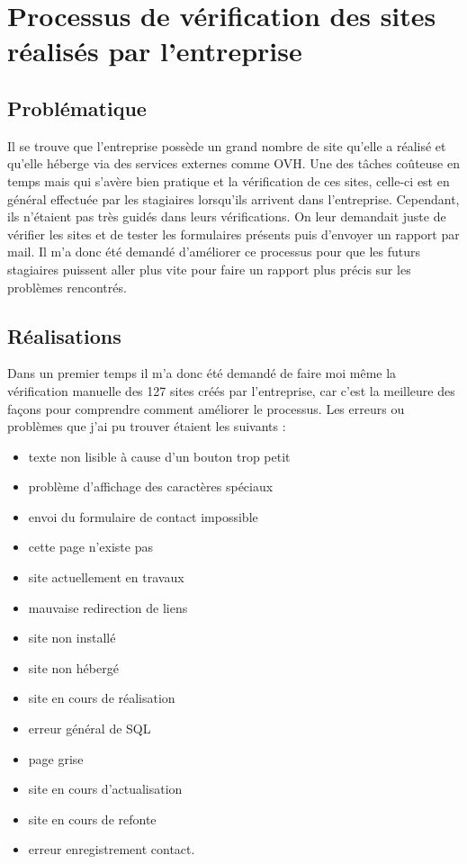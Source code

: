 \documentclass[report]{tnreport}
\begin{document}
\chapter{Processus de vérification des sites réalisés par l’entreprise}

\section{Problématique}

Il se trouve que l’entreprise possède un grand nombre de site qu’elle a réalisé et qu’elle héberge via des services externes comme OVH. Une des tâches coûteuse en temps mais qui s’avère bien pratique et la vérification de ces sites, celle-ci est en général effectuée par les stagiaires lorsqu’ils arrivent dans l’entreprise. Cependant, ils n’étaient pas très guidés dans leurs vérifications. On leur demandait juste de vérifier les sites et de tester les formulaires présents puis d’envoyer un rapport par mail. Il m’a donc été demandé d’améliorer ce processus pour que les futurs stagiaires puissent aller plus vite pour faire un rapport plus précis sur les problèmes rencontrés.


\section{Réalisations}

Dans un premier temps il m’a donc été demandé de faire moi même la vérification manuelle des 127 sites créés par l’entreprise, car c’est la meilleure des façons pour comprendre comment améliorer le processus.
Les erreurs ou problèmes que j’ai pu trouver étaient les suivants : 

\begin{itemize}
\item texte non lisible à cause d’un bouton trop petit
\item problème d’affichage des caractères spéciaux
\item envoi du formulaire de contact impossible
\item cette page n’existe pas
\item site actuellement en travaux
\item mauvaise redirection de liens
\item site non installé
\item site non hébergé
\item site en cours de réalisation
\item erreur général de SQL
\item page grise
\item site en cours d’actualisation
\item site en cours de refonte
\item erreur enregistrement contact.
\end{itemize}
\end{document}
